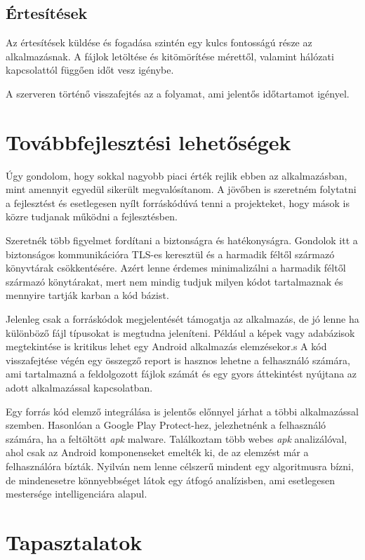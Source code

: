 \documentclass{thesis-ekf}
\theoremstyle{definition}
\theoremstyle{remark}
\begin{document}
\section{Értesítések}

Az értesítések küldése és fogadása szintén egy kulcs fontosságú része az alkalmazásnak.
A fájlok letöltése és kitömörítése mérettől, valamint hálózati kapcsolattól függően időt vesz igénybe.

A szerveren történő visszafejtés az a folyamat, ami jelentős időtartamot igényel.

\chapter{Továbbfejlesztési lehetőségek}\label{lehetosegek}

Úgy gondolom, hogy sokkal nagyobb piaci érték rejlik ebben az alkalmazásban, mint amennyit egyedül sikerült megvalósítanom.
A jövőben is szeretném folytatni a fejlesztést és esetlegesen nyílt forráskódúvá tenni a projekteket, hogy mások is közre tudjanak működni a fejlesztésben.

Szeretnék több figyelmet fordítani a biztonságra és hatékonyságra. 
Gondolok itt a biztonságos kommunikációra TLS-es keresztül és a harmadik féltől származó könyvtárak csökkentésére.
Azért lenne érdemes minimalizálni a harmadik féltől származó könytárakat, mert nem mindig tudjuk milyen kódot tartalmaznak és mennyire tartják karban a kód bázist.

Jelenleg csak a forráskódok megjelentését támogatja az alkalmazás, de jó lenne ha különböző fájl típusokat is megtudna jeleníteni.
Például a képek vagy adabázisok megtekintése is kritikus lehet egy Android alkalmazás elemzésekor.s
A kód visszafejtése végén egy összegző report is hasznos lehetne a felhasználó számára, ami tartalmazná a feldolgozott fájlok számát és egy gyors áttekintést nyújtana az adott alkalmazással kapcsolatban.

Egy forrás kód elemző integrálása is jelentős előnnyel járhat a többi alkalmazással szemben. Hasonlóan a Google Play Protect-hez, jelezhetnénk a felhasználó számára, ha a feltöltött \emph{apk} malware.
Találkoztam több webes \emph{apk} analizálóval, ahol csak az Android komponenseket emelték ki, de az elemzést már a felhasználóra bízták.
Nyilván nem lenne célszerű mindent egy algoritmusra bízni, de mindenesetre könnyebbséget látok egy átfogó analízisben, ami esetlegesen mestersége intelligenciára alapul.

\chapter{Tapasztalatok}\label{tapasztalatok}
\end{document}
